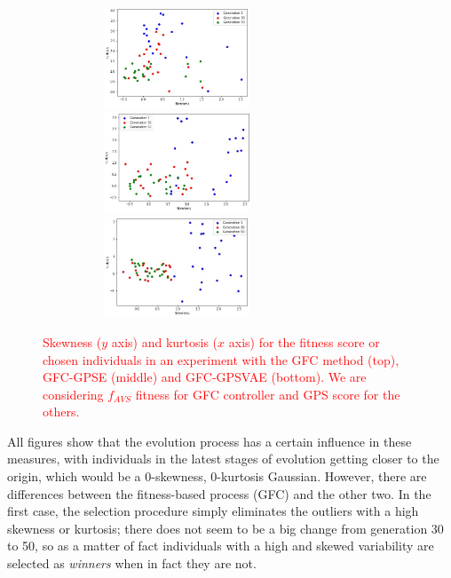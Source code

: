 \documentclass[10pt,journal,compsoc]{IEEEtran}
\begin{document}
\begin{figure}[ht]	
	\begin{center}
          \includegraphics[width=8cm, height=3cm]{fig/GFC__.jpg}
          \includegraphics[width=8cm, height=3cm]{fig/GFCRSE__.jpg}
          \includegraphics[width=8cm, height=3cm]{fig/GFCVARSE__.jpg}
		\caption{\textcolor{red}{Skewness ($y$ axis) and kurtosis ($x$ axis)
                  for the fitness score or chosen individuals in an experiment with the {\sf GFC} method \cite{salem_cig2018} (top), {\sf GFC-GPSE} (middle) and {\sf GFC-GPSVAE} (bottom). We are considering $f_{AVS}$ fitness for GFC controller and GPS score for the others.}}
		\label{fig:gfcsk}
		 \label{fig:gfcrsesk} 
		 \label{fig:gfcvarsesk}			
	\end{center}	
\end{figure}

All figures show that the evolution process has a certain influence in
these measures, with individuals in the latest stages of evolution
getting closer to the origin, which would be a 0-skewness, 0-kurtosis
Gaussian. However, there are differences between the fitness-based
process ({\sf GFC}) and the other two. In the first case, the
selection procedure simply eliminates the outliers with a high
skewness or kurtosis; there does not seem to be a big change from
generation 30 to 50, so as a matter of fact individuals with a high
and skewed variability are selected as {\em winners} when in fact they
are not.
\end{document}
